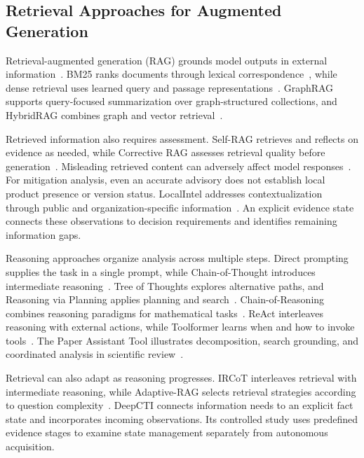 \documentclass[conference]{IEEEtran}
\begin{document}
\subsection{Retrieval Approaches for Augmented Generation}

Retrieval-augmented generation (RAG) grounds model outputs in external
information~\cite{lewis2020rag}. BM25 ranks documents through lexical
correspondence~\cite{robertson2009bm25}, while dense retrieval uses
learned query and passage representations~\cite{karpukhin2020dense}.
GraphRAG supports query-focused summarization over graph-structured
collections, and HybridRAG combines graph and vector
retrieval~\cite{edge2024graphrag,sarmah2024hybridrag}.

Retrieved information also requires assessment. Self-RAG retrieves and
reflects on evidence as needed, while Corrective RAG assesses retrieval
quality before generation~\cite{asai2024selfrag,yan2024crag}.
Misleading retrieved content can adversely affect model
responses~\cite{hong2024gullible}. For mitigation analysis, even an
accurate advisory does not establish local product presence or version
status. LocalIntel addresses contextualization through public and
organization-specific information~\cite{mitra2024localintel}.
An explicit evidence state connects these observations to decision
requirements and identifies remaining information gaps.

Reasoning approaches organize analysis across multiple steps. Direct
prompting supplies the task in a single prompt, while Chain-of-Thought
introduces intermediate reasoning~\cite{wei2022cot}. Tree of Thoughts
explores alternative paths, and Reasoning via Planning applies planning
and search~\cite{yao2023tot,hao2023rap}. Chain-of-Reasoning combines
reasoning paradigms for mathematical tasks~\cite{yu2025cor}.
ReAct interleaves reasoning with external actions, while Toolformer
learns when and how to invoke tools~\cite{yao2023react,schick2023toolformer}.
The Paper Assistant Tool illustrates decomposition, search grounding,
and coordinated analysis in scientific review~\cite{jayaram2026pat}.

Retrieval can also adapt as reasoning progresses. IRCoT interleaves
retrieval with intermediate reasoning, while Adaptive-RAG selects
retrieval strategies according to question
complexity~\cite{trivedi2023ircot,jeong2024adaptiverag}.
DeepCTI connects information needs to an explicit fact state and
incorporates incoming observations. Its controlled study uses
predefined evidence stages to examine state management separately
from autonomous acquisition.
\end{document}
